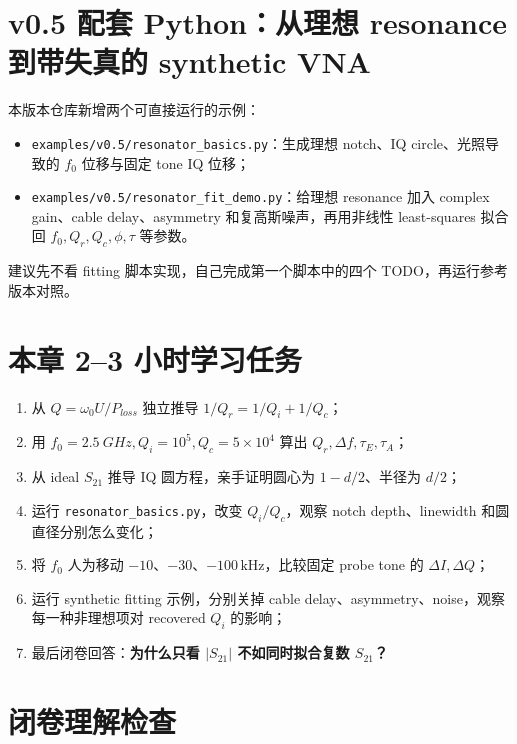 \documentclass[11pt,a4paper,openany]{ctexrep}
\begin{document}
\section{v0.5 配套 Python：从理想 resonance 到带失真的 synthetic VNA}

本版本仓库新增两个可直接运行的示例：
\begin{itemize}
  \item \texttt{examples/v0.5/resonator\_basics.py}：生成理想 notch、IQ circle、光照导致的 $f_0$ 位移与固定 tone IQ 位移；
  \item \texttt{examples/v0.5/resonator\_fit\_demo.py}：给理想 resonance 加入 complex gain、cable delay、asymmetry 和复高斯噪声，再用非线性 least-squares 拟合回 $f_0,Q_r,Q_c,\phi,\tau$ 等参数。
\end{itemize}

建议先不看 fitting 脚本实现，自己完成第一个脚本中的四个 TODO，再运行参考版本对照。

\section{本章 2--3 小时学习任务}

\begin{enumerate}
  \item 从 $Q=\omega_0U/P_{loss}$ 独立推导 $1/Q_r=1/Q_i+1/Q_c$；
  \item 用 $f_0=\SI{2.5}{GHz},Q_i=10^5,Q_c=5\times10^4$ 算出 $Q_r,\Delta f,\tau_E,\tau_A$；
  \item 从 ideal $S_{21}$ 推导 IQ 圆方程，亲手证明圆心为 $1-d/2$、半径为 $d/2$；
  \item 运行 \texttt{resonator\_basics.py}，改变 $Q_i/Q_c$，观察 notch depth、linewidth 和圆直径分别怎么变化；
  \item 将 $f_0$ 人为移动 $-10$、$-30$、$-100\,\mathrm{kHz}$，比较固定 probe tone 的 $\Delta I,\Delta Q$；
  \item 运行 synthetic fitting 示例，分别关掉 cable delay、asymmetry、noise，观察每一种非理想项对 recovered $Q_i$ 的影响；
  \item 最后闭卷回答：\textbf{为什么只看 $|S_{21}|$ 不如同时拟合复数 $S_{21}$？}
\end{enumerate}

\section{闭卷理解检查}
\end{document}

